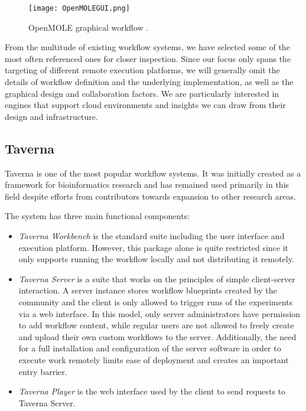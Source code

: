 \begin{figure}[h]
	\centering
		\texttt{[image: OpenMOLEGUI.png]}
	\caption{OpenMOLE graphical workflow \cite{Reuillon2012}.}
	\label{OpenMOLEGUI}
\end{figure}

From the multitude of existing workflow systems, we have selected some of the most often referenced ones for closer inspection. Since our focus only spans the targeting of different remote execution platforms, we will generally omit the details of workflow definition and the underlying implementation, as well as the graphical design and collaboration factors. We are particularly interested in engines that support cloud environments and insights we can draw from their design and infrastructure.

\subsection{Taverna}

Taverna \cite{Wolstencroft2013} is one of the most popular workflow systems. It was initially created as a framework for bioinformatics research and has remained used primarily in this field despite efforts from contributors towards expansion to other research areas.

The system has three main functional components:
\begin{itemize}
	\item \textit{Taverna Workbench} is the standard suite including the user interface and execution platform. However, this package alone is quite restricted since it only supports running the workflow locally and not distributing it remotely.
	\item \textit{Taverna Server} is a suite that works on the principles of simple client-server interaction. A server instance stores workflow blueprints created by the community and the client is only allowed to trigger runs of the experiments via a web interface. In this model, only server administrators have permission to add workflow content, while regular users are not allowed to freely create and upload their own custom workflows to the server. Additionally, the need for a full installation and configuration of the server software in order to execute work remotely limits ease of deployment and creates an important entry barrier.
	\item \textit{Taverna Player} is the web interface used by the client to send requests to Taverna Server.
\end{itemize}

